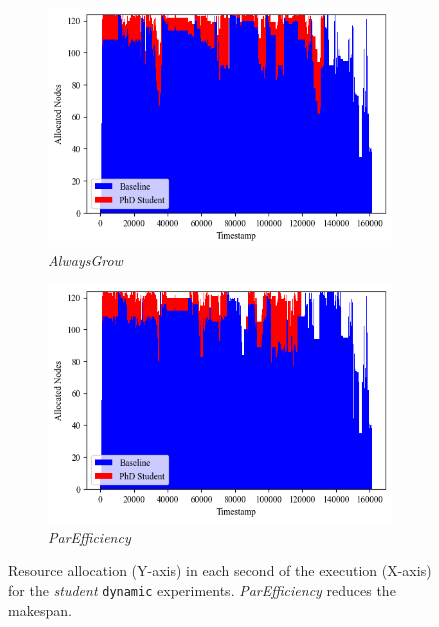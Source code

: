 \documentclass[a4paper,fleqn]{cas-dc}
\begin{document}
\begin{figure}[tbp]
    \begin{minipage}[b]{.4\textwidth}
    \begin{subfigure}[t]{\columnwidth}
        \includegraphics[clip, width=\linewidth, trim={0.1cm 1.25cm 0.1cm 0.2cm}]{figures/AlwaysGrow.png}
        \caption{\textit{AlwaysGrow}}
        \label{multifig:dyngrow}
        \vspace{3mm}
    \end{subfigure}
    \begin{subfigure}[t]{\columnwidth}
        \includegraphics[clip, width=\linewidth, trim={0.1cm 0.3cm 0.1cm 0cm}]{figures/ParEfficiency.png}
        \caption{\textit{ParEfficiency}}
        \label{multifig:dynpe}
    \end{subfigure}
    \caption{
    Resource allocation (Y-axis) in each second of the execution (X-axis) for the \textit{student} \texttt{dynamic} experiments. \textit{ParEfficiency} reduces the makespan.}
    \end{minipage}
\end{figure}
\fi
\end{document}
